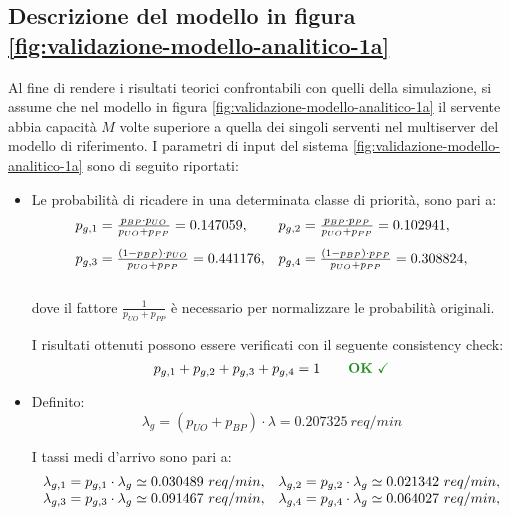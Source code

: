 \subsection{Descrizione del modello in figura \ref{fig:validazione-modello-analitico-1a}}
Al fine di rendere i risultati teorici confrontabili con quelli della simulazione, si assume che nel modello in figura \ref{fig:validazione-modello-analitico-1a} il servente abbia capacità $M$ volte superiore a quella dei singoli serventi nel multiserver del modello di riferimento.
\newpage
I parametri di input del sistema \ref{fig:validazione-modello-analitico-1a} sono di seguito riportati:
\begin{itemize}
\item Le probabilità di ricadere in una determinata classe di priorità, sono pari a:
\begin{equation}
\begin{array}{l l}
p_{g,1} = \frac{p_{BP} \cdot p_{UO}}{p_{UO} + p_{PP}} = 0.147059, & p_{g,2} = \frac{p_{BP} \cdot p_{PP}}{p_{UO} + p_{PP}} = 0.102941, \\[1em]
p_{g,3} = \frac{(1-p_{BP}) \cdot p_{UO}}{p_{UO} + p_{PP}} = 0.441176, & p_{g,4} = \frac{(1-p_{BP}) \cdot p_{PP}}{p_{UO} + p_{PP}} = 0.308824, \\[1.5em]
\end{array}
\end{equation}
dove il fattore $\frac{1}{p_{UO} + p_{PP}}$ è necessario per normalizzare le probabilità originali.

I risultati ottenuti possono essere verificati con il seguente consistency check:
\begin{equation}
p_{g,1} + p_{g,2} + p_{g,3} + p_{g,4} = 1 \qquad \text{\color{forestgreen}\textbf{OK} \checkmark}
\end{equation}
\item Definito:
\begin{equation}
\lambda_g = (p_{UO} + p_{BP})\cdot \lambda = 0.207325\ req/min
\end{equation} 

I tassi medi d'arrivo sono pari a:
\begin{equation}
\begin{array}{l l}
\lambda_{g,1} = p_{g,1} \cdot \lambda_g \simeq 0.030489\ req/min, & \lambda_{g,2} = p_{g,2} \cdot \lambda_g \simeq 0.021342\ req/min, \\
\lambda_{g,3} = p_{g,3} \cdot \lambda_g \simeq 0.091467\ req/min, & \lambda_{g,4} = p_{g,4} \cdot \lambda_g \simeq 0.064027\ req/min, \\[1em]
\end{array}
\end{equation}


\end{itemize}
